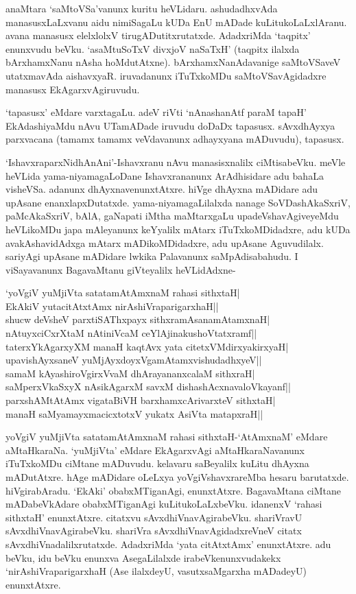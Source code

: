 anaMtara `saMtoVSa'vanunx kuritu heVLidaru. ashudadhxvAda manasusxLaLxvanu aidu nimiSagaLu kUDa EnU mADade kuLitukoLaLxlAranu. avana manasusx elelxlolxV tirugADutitxrutatxde. AdadxriMda `taqpitx' enunxvudu beVku. `asaMtuSoTxV divxjoV naSaTxH' (taqpitx ilalxda bArxhamxNanu nAsha hoMdutAtxne). bArxhamxNanAdavanige saMtoVSaveV utatxmavAda aishavxyaR. iruvadanunx iTuTxkoMDu saMtoVSavAgidadxre manasusx EkAgarxvAgiruvudu.

`tapasusx' eMdare varxtagaLu. adeV riVti `nAnashanAtf paraM tapaH' EkAdashiyaMdu nAvu UTamADade iruvudu doDaDx tapasusx. sAvxdhAyxya parxvacana (tamamx tamamx veVdavanunx adhayxyana mADuvudu), tapasusx.

`IshavxraparxNidhAnAni'-Ishavxranu nAvu manasisxnalilx ciMtisabeVku. meVle heVLida yama-niyamagaLoDane Ishavxrananunx ArAdhisidare adu bahaLa visheVSa. adanunx dhAyxnavenunxtAtxre. hiVge dhAyxna mADidare adu upAsane enanxlapxDutatxde. yama-niyamagaLilalxda nanage SoVDashAkaSxriV, paMcAkaSxriV, bAlA, gaNapati iMtha maMtarxgaLu upadeVshavAgiveyeMdu heVLikoMDu japa mAleyanunx keYyalilx mAtarx iTuTxkoMDidadxre, adu kUDa avakAshavidAdxga mAtarx mADikoMDidadxre, adu upAsane Aguvudilalx. sariyAgi upAsane mADidare lwkika Palavanunx saMpAdisabahudu. I viSayavanunx BagavaMtanu giVteyalilx heVLidAdxne-

\begin{shloka}
`yoVgiV yuMjiVta satatamAtAmxnaM rahasi sithxtaH|\\
EkAkiV yutacitAtxtAmx nirAshiVraparigarxhaH||\\
shucw deVsheV parxtiSAThxpayx sithxramAsanamAtamxnaH|\\
nAtuyxciCxrXtaM nAtiniVcaM ceYlAjinakushoVtatxramf||\\
taterxYkAgarxyXM manaH kaqtAvx yata citetxVMdirxyakirxyaH|\\
upavishAyxsaneV yuMjAyxdoyxVgamAtamxvishudadhxyeV||\\
samaM kAyashiroVgirxVvaM dhArayananxcalaM sithxraH|\\
saMperxVkaSxyX nAsikAgarxM savxM dishashAcxnavaloVkayanf||\\
parxshAMtAtAmx vigataBiVH barxhamxcArivarxteV sithxtaH|\\
manaH saMyamayxmacicxtotxV yukatx AsiVta matapxraH||
\end{shloka}

yoVgiV yuMjiVta satatamAtAmxnaM rahasi sithxtaH-`AtAmxnaM' eMdare aMtaHkaraNa. `yuMjiVta' eMdare EkAgarxvAgi aMtaHkaraNavanunx iTuTxkoMDu ciMtane mADuvudu. kelavaru saBeyalilx kuLitu dhAyxna mADutAtxre. hAge mADidare oLeLxya yoVgiVshavxrareMba hesaru barutatxde. hiVgirabAradu. `EkAki' obabxMTiganAgi, enunxtAtxre. BagavaMtana ciMtane mADabeVkAdare obabxMTiganAgi kuLitukoLaLxbeVku. idanenxV `rahasi sithxtaH' enunxtAtxre. citatxvu sAvxdhiVnavAgirabeVku. shariVravU sAvxdhiVnavAgirabeVku. shariVra sAvxdhiVnavAgidadxreVneV citatx sAvxdhiVnadalilxrutatxde. AdadxriMda `yata citAtxtAmx' enunxtAtxre. adu beVku, idu beVku enunxva AsegaLilalxde irabeVkenunxvudakekx `nirAshiVraparigarxhaH (Ase ilalxdeyU, vasutxsaMgarxha mADadeyU) enunxtAtxre.

